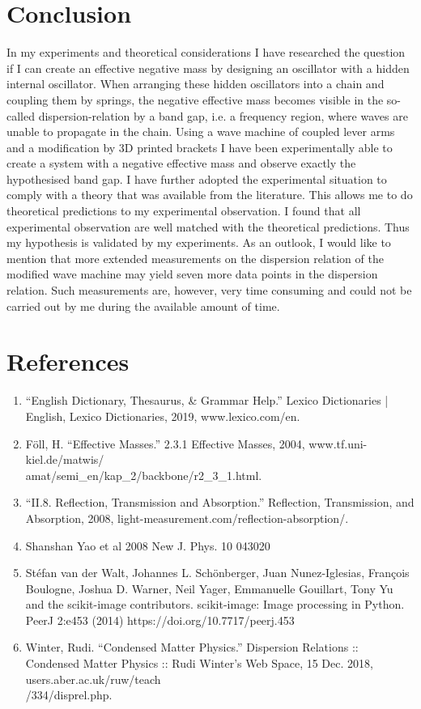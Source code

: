 \documentclass[12pt]{article}
\begin{document}
\section{Conclusion}
In my experiments and theoretical considerations I have researched the question if I can create an effective negative mass by designing an oscillator with a hidden internal oscillator. When arranging these hidden oscillators into a chain and coupling them by springs, the negative effective mass becomes visible in the so-called dispersion-relation by a band gap, i.e. a frequency region, where waves are unable to propagate in the chain. 
Using a wave machine of coupled lever arms and a modification by 3D printed brackets I have been experimentally able to create a system with a negative effective mass and observe exactly the hypothesised band gap. I have further adopted the experimental situation to comply with a theory that was available from the literature. This allows me to do theoretical predictions to my experimental observation. I found that all experimental observation are well matched with the theoretical predictions. Thus my hypothesis is validated by my experiments. 
As an outlook, I would like to mention that more extended measurements on the dispersion relation of the modified wave machine may yield seven more data points in the dispersion relation. Such measurements are, however, very time consuming and could not be carried out by me during the available amount of time.
\clearpage
\section{References}
\begin{enumerate}
\item{“English Dictionary, Thesaurus, \& Grammar Help.” Lexico Dictionaries | English, Lexico Dictionaries, 2019, www.lexico.com/en.}
\item{Föll, H. “Effective Masses.” 2.3.1 Effective Masses, 2004, www.tf.uni-kiel.de/matwis/\\amat/semi\_en/kap\_2/backbone/r2\_3\_1.html.}
\item{“II.8. Reflection, Transmission and Absorption.” Reflection, Transmission, and Absorption, 2008, light-measurement.com/reflection-absorption/.}
\item{Shanshan Yao et al 2008 New J. Phys. 10 043020}
\item{Stéfan van der Walt, Johannes L. Schönberger, Juan Nunez-Iglesias, François Boulogne, Joshua D. Warner, Neil Yager, Emmanuelle Gouillart, Tony Yu and the scikit-image contributors. scikit-image: Image processing in Python. PeerJ 2:e453 (2014) https://doi.org/10.7717/peerj.453}
\item{Winter, Rudi. “Condensed Matter Physics.” Dispersion Relations :: Condensed Matter Physics :: Rudi Winter's Web Space, 15 Dec. 2018, users.aber.ac.uk/ruw/teach\\/334/disprel.php.}
\end{enumerate}
\clearpage
\end{document}

